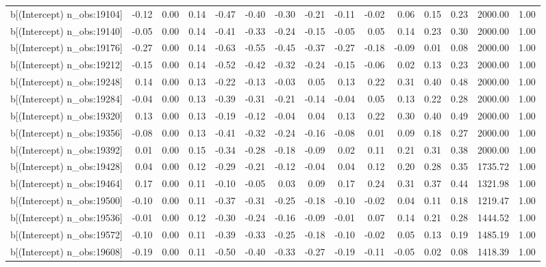 \begin{table}[ht]
\begin{tabular}{rrrrrrrrrrrrrrr}
  b[(Intercept) n\_obs:19104] & -0.12 & 0.00 & 0.14 & -0.47 & -0.40 & -0.30 & -0.21 & -0.11 & -0.02 & 0.06 & 0.15 & 0.23 & 2000.00 & 1.00 \\ 
  b[(Intercept) n\_obs:19140] & -0.05 & 0.00 & 0.14 & -0.41 & -0.33 & -0.24 & -0.15 & -0.05 & 0.05 & 0.14 & 0.23 & 0.30 & 2000.00 & 1.00 \\ 
  b[(Intercept) n\_obs:19176] & -0.27 & 0.00 & 0.14 & -0.63 & -0.55 & -0.45 & -0.37 & -0.27 & -0.18 & -0.09 & 0.01 & 0.08 & 2000.00 & 1.00 \\ 
  b[(Intercept) n\_obs:19212] & -0.15 & 0.00 & 0.14 & -0.52 & -0.42 & -0.32 & -0.24 & -0.15 & -0.06 & 0.02 & 0.13 & 0.23 & 2000.00 & 1.00 \\ 
  b[(Intercept) n\_obs:19248] & 0.14 & 0.00 & 0.13 & -0.22 & -0.13 & -0.03 & 0.05 & 0.13 & 0.22 & 0.31 & 0.40 & 0.48 & 2000.00 & 1.00 \\ 
  b[(Intercept) n\_obs:19284] & -0.04 & 0.00 & 0.13 & -0.39 & -0.31 & -0.21 & -0.14 & -0.04 & 0.05 & 0.13 & 0.22 & 0.28 & 2000.00 & 1.00 \\ 
  b[(Intercept) n\_obs:19320] & 0.13 & 0.00 & 0.13 & -0.19 & -0.12 & -0.04 & 0.04 & 0.13 & 0.22 & 0.30 & 0.40 & 0.49 & 2000.00 & 1.00 \\ 
  b[(Intercept) n\_obs:19356] & -0.08 & 0.00 & 0.13 & -0.41 & -0.32 & -0.24 & -0.16 & -0.08 & 0.01 & 0.09 & 0.18 & 0.27 & 2000.00 & 1.00 \\ 
  b[(Intercept) n\_obs:19392] & 0.01 & 0.00 & 0.15 & -0.34 & -0.28 & -0.18 & -0.09 & 0.02 & 0.11 & 0.21 & 0.31 & 0.38 & 2000.00 & 1.00 \\ 
  b[(Intercept) n\_obs:19428] & 0.04 & 0.00 & 0.12 & -0.29 & -0.21 & -0.12 & -0.04 & 0.04 & 0.12 & 0.20 & 0.28 & 0.35 & 1735.72 & 1.00 \\ 
  b[(Intercept) n\_obs:19464] & 0.17 & 0.00 & 0.11 & -0.10 & -0.05 & 0.03 & 0.09 & 0.17 & 0.24 & 0.31 & 0.37 & 0.44 & 1321.98 & 1.00 \\ 
  b[(Intercept) n\_obs:19500] & -0.10 & 0.00 & 0.11 & -0.37 & -0.31 & -0.25 & -0.18 & -0.10 & -0.02 & 0.04 & 0.11 & 0.18 & 1219.47 & 1.00 \\ 
  b[(Intercept) n\_obs:19536] & -0.01 & 0.00 & 0.12 & -0.30 & -0.24 & -0.16 & -0.09 & -0.01 & 0.07 & 0.14 & 0.21 & 0.28 & 1444.52 & 1.00 \\ 
  b[(Intercept) n\_obs:19572] & -0.10 & 0.00 & 0.11 & -0.39 & -0.33 & -0.25 & -0.18 & -0.10 & -0.02 & 0.05 & 0.13 & 0.19 & 1485.19 & 1.00 \\ 
  b[(Intercept) n\_obs:19608] & -0.19 & 0.00 & 0.11 & -0.50 & -0.40 & -0.33 & -0.27 & -0.19 & -0.11 & -0.05 & 0.02 & 0.08 & 1418.39 & 1.00 \\ 

\end{tabular}
\end{table}
